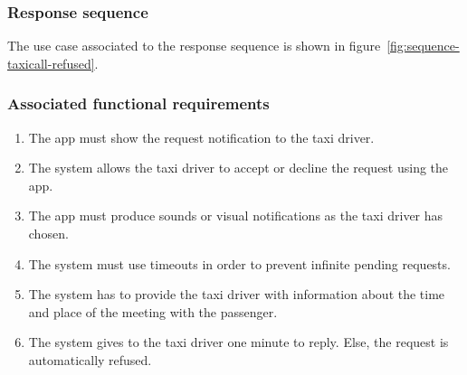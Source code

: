 \subsubsection{Response sequence}
The use case associated to the response sequence is shown in figure~\ref{fig:sequence-taxicall-refused}.

\subsubsection{Associated functional requirements}
\begin{enumerate}
\item The app must show the request notification to the taxi driver.
\item The system allows the taxi driver to accept or decline the request using the app.
\item The app must produce sounds or visual notifications as the taxi driver has chosen.
\item The system must use timeouts in order to prevent infinite pending requests.
\item The system has to provide the taxi driver with information about the time and place of the meeting with the passenger.
\item The system gives to the taxi driver one minute to reply. Else, the request is automatically refused.
\end{enumerate}
